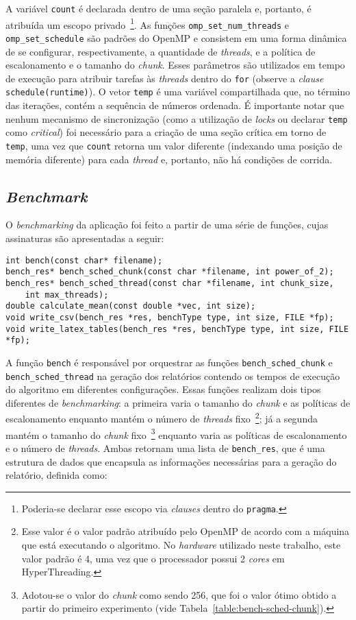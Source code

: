 \documentclass[12pt,a4paper]{article}
\begin{document}
A variável \texttt{count} é declarada dentro de uma seção paralela e, portanto,
é atribuída um escopo privado~\footnote{Poderia-se declarar esse escopo via
\textit{clauses} dentro do \texttt{pragma}.}. As funções
\texttt{omp\_set\_num\_threads} e \texttt{omp\_set\_schedule} são padrões do
OpenMP e consistem em uma forma dinâmica de se configurar, respectivamente, a
quantidade de \textit{threads}, e a política de escalonamento e o tamanho do
\textit{chunk}. Esses parâmetros são utilizados em tempo de execução para
atribuir tarefas às \textit{threads} dentro do \texttt{for} (observe a
\textit{clause} \texttt{schedule(runtime)}). O vetor \texttt{temp} é uma
variável compartilhada que, no término das iterações, contém a sequência de
números ordenada. É importante notar que nenhum mecanismo de sincronização (como
a utilização de \textit{locks} ou declarar \texttt{temp} como \emph{critical})
foi necessário para a criação de uma seção crítica em torno de \texttt{temp},
uma vez que \texttt{count} retorna um valor diferente (indexando uma posição de
memória diferente) para cada \textit{thread} e, portanto, não há condições de
corrida.


\subsection{\textit{Benchmark}}
O \textit{benchmarking} da aplicação foi feito a partir de uma série de funções,
cujas assinaturas são apresentadas a seguir:

\begin{verbatim}
int bench(const char* filename);
bench_res* bench_sched_chunk(const char *filename, int power_of_2);
bench_res* bench_sched_thread(const char *filename, int chunk_size,
    int max_threads);
double calculate_mean(const double *vec, int size);
void write_csv(bench_res *res, benchType type, int size, FILE *fp);
void write_latex_tables(bench_res *res, benchType type, int size, FILE *fp);
\end{verbatim}

A função \texttt{bench} é responsável por orquestrar as funções
\texttt{bench\_sched\_chunk} e \texttt{bench\_sched\_thread} na geração dos
relatórios contendo os tempos de execução do algoritmo em diferentes
configurações. Essas funções realizam dois tipos diferentes de
\textit{benchmarking}: a primeira varia o tamanho do \textit{chunk} e as
políticas de escalonamento enquanto mantém o número de \textit{threads}
fixo~\footnote{Esse valor é o valor padrão atribuído pelo OpenMP de acordo com a
máquina que está executando o algoritmo. No \textit{hardware} utilizado neste
trabalho, este valor padrão é 4, uma vez que o processador possui 2
\textit{cores} em HyperThreading.}; já a segunda mantém o tamanho do
\textit{chunk} fixo~\footnote{Adotou-se o valor do \textit{chunk} como sendo
256, que foi o valor ótimo obtido a partir do primeiro experimento (vide
Tabela~\ref{table:bench-sched-chunk}).} enquanto varia as políticas de
escalonamento e o número de \textit{threads}. Ambas retornam uma lista de
\texttt{bench\_res}, que é uma estrutura de dados que encapsula as informações
necessárias para a geração do relatório, definida como:
\end{document}
